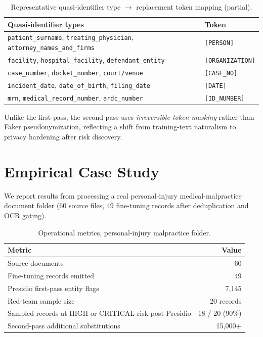 \documentclass[11pt,a4paper]{article}
\begin{document}
\begin{table}[ht]
\centering
\caption{Representative quasi-identifier type $\rightarrow$ replacement token mapping (partial).}
\label{tab:tokens}
\small
\begin{tabular}{@{}ll@{}}
\toprule
\textbf{Quasi-identifier types} & \textbf{Token} \\
\midrule
\texttt{patient\_surname}, \texttt{treating\_physician}, \texttt{attorney\_names\_and\_firms} & \texttt{[PERSON]} \\
\texttt{facility}, \texttt{hospital\_facility}, \texttt{defendant\_entity} & \texttt{[ORGANIZATION]} \\
\texttt{case\_number}, \texttt{docket\_number}, \texttt{court/venue} & \texttt{[CASE\_NO]} \\
\texttt{incident\_date}, \texttt{date\_of\_birth}, \texttt{filing\_date} & \texttt{[DATE]} \\
\texttt{mrn}, \texttt{medical\_record\_number}, \texttt{ardc\_number} & \texttt{[ID\_NUMBER]} \\
\bottomrule
\end{tabular}
\end{table}

Unlike the first pass, the second pass uses \emph{irreversible token masking} rather than Faker pseudonymization, reflecting a shift from training-text naturalism to privacy hardening after risk discovery.

\section{Empirical Case Study}

We report results from processing a real personal-injury medical-malpractice document folder (60 source files, 49 fine-tuning records after deduplication and OCR gating).

\begin{table}[ht]
\centering
\caption{Operational metrics, personal-injury malpractice folder.}
\label{tab:case-study}
\begin{tabular}{@{}lr@{}}
\toprule
\textbf{Metric} & \textbf{Value} \\
\midrule
Source documents & 60 \\
Fine-tuning records emitted & 49 \\
Presidio first-pass entity flags & 7{,}145 \\
Red-team sample size & 20 records \\
Sampled records at HIGH or CRITICAL risk post-Presidio & 18 / 20 (90\%) \\
Second-pass additional substitutions & 15{,}000+ \\
\bottomrule
\end{tabular}
\end{table}
\end{document}
